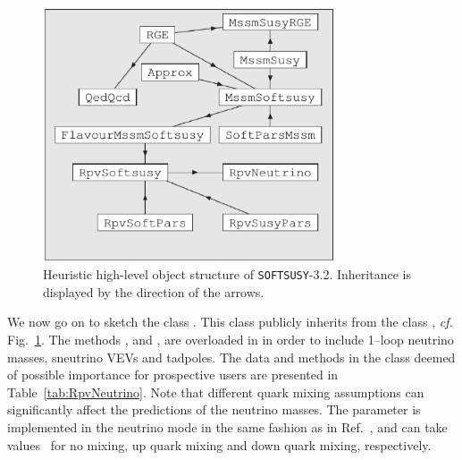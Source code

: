\documentclass[pdflatex,final,3p,times]{elsarticle}
\def\SOFTSUSY{{\tt SOFTSUSY}}
\begin{document}
\begin{figure}
\begin{center}
\includegraphics[width=245pt]{neutobj.eps}
\end{center}
\caption{Heuristic high-level object structure of \SOFTSUSY-3.2. Inheritance is
displayed by the direction of the arrows. \label{fig:objstruc}}
\end{figure}


We now go on to sketch the class .  This class
publicly inherits from the class , \textit{cf.} Fig.~\ref{fig:objstruc}. 
The  methods ,   
and  ,   are overloaded  in  in order to 
include 1--loop neutrino masses, sneutrino VEVs and tadpoles.
The data and methods in the
 class deemed of possible importance for prospective
users are presented in Table~\ref{tab:RpvNeutrino}.
Note that different quark mixing 
assumptions can significantly 
affect the predictions of the neutrino masses. The  parameter is
implemented   in the neutrino mode in the same fashion as in
Ref.~\cite{Allanach:2001kg}, and can take values ~for no mixing,
up quark mixing and down quark mixing, respectively.
\end{document}
